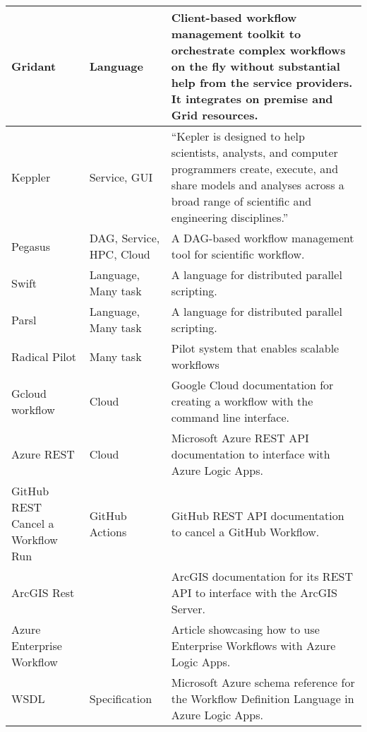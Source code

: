 \begin{table*}[htb]
{{\begin{tabular}{|p{3cm}|p{3cm}|p{10cm}|}
Gridant  \cite{las-2004-gridant} & Language & 
Client-based workflow management toolkit to orchestrate complex workflows on the fly without substantial help from the service providers. It integrates on premise and Grid resources. \\
\hline

Keppler  \cite{www-kepler} & Service, GUI & ``Kepler is designed to help scientists, analysts, and computer programmers create, execute, and share models and analyses across a broad range of scientific and engineering disciplines.'' \\
\hline

Pegasus  \cite{www-pegasus} & DAG, Service, HPC, Cloud &  A DAG-based workflow management tool for scientific workflow.  \\
\hline

Swift \cite{las-2007-swift} & Language, Many task & A language for distributed parallel scripting.\\
\hline

Parsl \cite{www-parsl} & Language, Many task & A language for distributed parallel scripting. \\
\hline

Radical Pilot \cite{arxiv-radical-pilot} & Many task & Pilot system that enables scalable workflows \\ 
\hline

Gcloud workflow \cite{www-gcloud} & Cloud & Google Cloud documentation for creating a workflow with the command line interface. \\
\hline

Azure REST \cite{www-azure-rest} & Cloud & Microsoft Azure REST API documentation to interface with Azure Logic Apps. \\
\hline

GitHub REST Cancel a Workflow Run \cite{www-github-rest-cancel}
& GitHub Actions
& GitHub REST API documentation to cancel a GitHub Workflow. \\
\hline

ArcGIS Rest \cite{www-arcgis-rest} & & ArcGIS documentation for its REST API to interface with the ArcGIS Server. \\
\hline

Azure Enterprise Workflow \cite{www-azure-enterprise-workflow} & & Article showcasing how to use Enterprise Workflows with Azure Logic Apps. \\
\hline

WSDL \cite{www-wsdl} & Specification & Microsoft Azure schema reference for the Workflow Definition Language in Azure Logic Apps. \\
  \hline


\end{tabular}}}
\end{table*}
